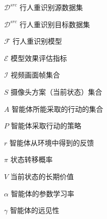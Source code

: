 \begin{denotation}
    \item[$\mathcal{D}^{src}$]    行人重识别源数据集
    \item[$\mathcal{D}^{src}$]    行人重识别目标数据集
    \item[$\mathcal{F}$]    行人重识别模型
    \item[$\mathcal{E}$]    模型效果评估指标
    \item[$\mathcal{I}$]    视频画面帧集合
    \item[$S$]              摄像头方案（当前状态）集合
    \item[$A$]              智能体所能采取的行动的集合
    \item[$P$]              智能体采取行动的策略
    \item[$r$]              智能体从环境中得到的反馈
    \item[$\pi$]            状态转移概率
    \item[$V$]              当前状态的长期价值
    \item[$\alpha$]         智能体的参数学习率
    \item[$\gamma$]         智能体的远见性
\end{denotation}

